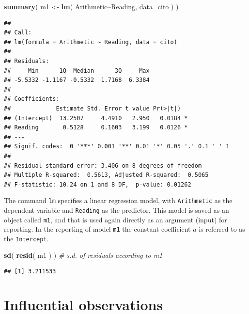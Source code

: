 \documentclass[
]{book}
\newenvironment{Shaded}{\begin{snugshade}}{\end{snugshade}}
\newcommand{\AttributeTok}[1]{\textcolor[rgb]{0.13,0.29,0.53}{#1}}
\newcommand{\CommentTok}[1]{\textcolor[rgb]{0.56,0.35,0.01}{\textit{#1}}}
\newcommand{\FunctionTok}[1]{\textcolor[rgb]{0.13,0.29,0.53}{\textbf{#1}}}
\newcommand{\NormalTok}[1]{#1}
\newcommand{\OtherTok}[1]{\textcolor[rgb]{0.56,0.35,0.01}{#1}}
\newcommand{\SpecialCharTok}[1]{\textcolor[rgb]{0.81,0.36,0.00}{\textbf{#1}}}
\begin{document}
\begin{Shaded}
\begin{Highlighting}[]
\FunctionTok{summary}\NormalTok{( m1 }\OtherTok{\textless{}{-}} \FunctionTok{lm}\NormalTok{( Arithmetic}\SpecialCharTok{\textasciitilde{}}\NormalTok{Reading, }\AttributeTok{data=}\NormalTok{cito ) )}
\end{Highlighting}
\end{Shaded}

\begin{verbatim}
## 
## Call:
## lm(formula = Arithmetic ~ Reading, data = cito)
## 
## Residuals:
##     Min      1Q  Median      3Q     Max 
## -5.5332 -1.1167 -0.5332  1.7168  6.3384 
## 
## Coefficients:
##             Estimate Std. Error t value Pr(>|t|)  
## (Intercept)  13.2507     4.4910   2.950   0.0184 *
## Reading       0.5128     0.1603   3.199   0.0126 *
## ---
## Signif. codes:  0 '***' 0.001 '**' 0.01 '*' 0.05 '.' 0.1 ' ' 1
## 
## Residual standard error: 3.406 on 8 degrees of freedom
## Multiple R-squared:  0.5613, Adjusted R-squared:  0.5065 
## F-statistic: 10.24 on 1 and 8 DF,  p-value: 0.01262
\end{verbatim}

The command \texttt{lm} specifies a linear regression model, with \texttt{Arithmetic}
as the dependent variable and \texttt{Reading} as the predictor. This model is
saved as an object called \texttt{m1}, and that is used again directly as an argument
(input) for reporting. In the reporting of model \texttt{m1} the constant coefficient
\(a\) is referred to as the \texttt{Intercept}.

\begin{Shaded}
\begin{Highlighting}[]
\FunctionTok{sd}\NormalTok{( }\FunctionTok{resid}\NormalTok{( m1 ) ) }\CommentTok{\# s.d. of residuals according to \textasciigrave{}m1\textasciigrave{}}
\end{Highlighting}
\end{Shaded}

\begin{verbatim}
## [1] 3.211533
\end{verbatim}

\hypertarget{influential-observations}{%
\section{Influential observations}\label{influential-observations}}
\end{document}
